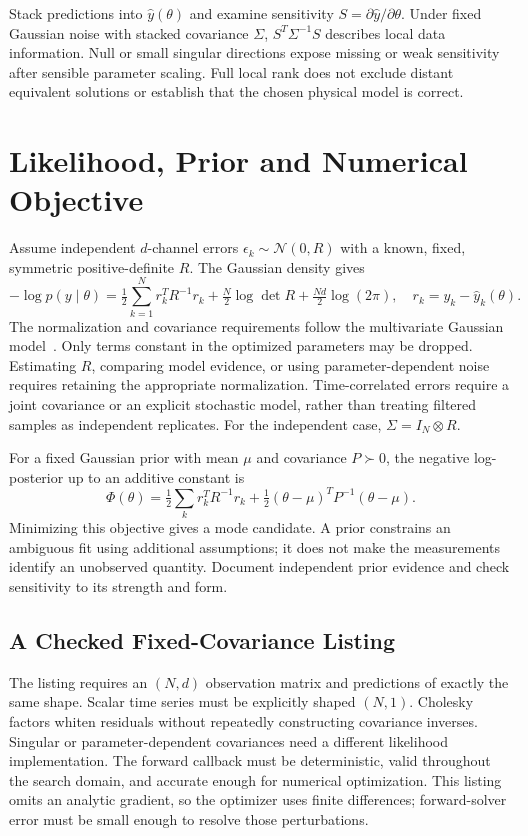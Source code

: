 Stack predictions into $\hat y(\theta)$ and examine sensitivity
$S=\partial\hat y/\partial\theta$. Under fixed Gaussian noise with stacked covariance
$\Sigma$, $S^T\Sigma^{-1}S$ describes local data information. Null or small singular
directions expose missing or weak sensitivity after sensible parameter scaling.
Full local rank does not exclude distant equivalent solutions or establish that
the chosen physical model is correct.

\section{Likelihood, Prior and Numerical Objective}
Assume independent $d$-channel errors $\epsilon_k\sim\mathcal N(0,R)$ with a known,
fixed, symmetric positive-definite $R$. The Gaussian density gives
\begin{equation}
 -\log p(y\mid\theta)=\tfrac12\sum_{k=1}^N r_k^TR^{-1}r_k+
 \tfrac N2\log\det R+\tfrac{Nd}{2}\log(2\pi),
 \quad r_k=y_k-\hat y_k(\theta).
\end{equation}
The normalization and covariance requirements follow the multivariate Gaussian
model~\cite{SciPyGaussianInference}. Only terms constant in the optimized parameters
may be dropped. Estimating $R$, comparing model evidence, or using parameter-dependent
noise requires retaining the appropriate normalization. Time-correlated errors
require a joint covariance or an explicit stochastic model, rather than treating
filtered samples as independent replicates. For the independent case,
$\Sigma=I_N\otimes R$.

For a fixed Gaussian prior with mean $\mu$ and covariance $P\succ0$, the negative
log-posterior up to an additive constant is
\begin{equation}
 \Phi(\theta)=\tfrac12\sum_k r_k^TR^{-1}r_k+
 \tfrac12(\theta-\mu)^TP^{-1}(\theta-\mu).
 \label{eq:ch8:map-objective}
\end{equation}
Minimizing this objective gives a mode candidate. A prior constrains an ambiguous
fit using additional assumptions; it does not make the measurements identify an
unobserved quantity. Document independent prior evidence and check sensitivity to
its strength and form.

\subsection{A Checked Fixed-Covariance Listing}
The listing requires an $(N,d)$ observation matrix and predictions of exactly the
same shape. Scalar time series must be explicitly shaped $(N,1)$. Cholesky factors
whiten residuals without repeatedly constructing covariance inverses. Singular or
parameter-dependent covariances need a different likelihood implementation.
The forward callback must be deterministic, valid throughout the search domain,
and accurate enough for numerical optimization. This listing omits an analytic
gradient, so the optimizer uses finite differences; forward-solver error must be
small enough to resolve those perturbations.

